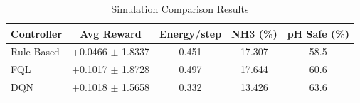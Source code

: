 \begin{table}[h]
\centering
\caption{Simulation Comparison Results}
\label{tab:sim}
\begin{tabular}{lcccc}
\hline
Controller & Avg Reward & Energy/step & NH3 (\%) & pH Safe (\%) \\
\hline
Rule-Based & +0.0466 $\pm$ 1.8337 & 0.451 & 17.307 & 58.5 \\
FQL & +0.1017 $\pm$ 1.8728 & 0.497 & 17.644 & 60.6 \\
DQN & +0.1018 $\pm$ 1.5658 & 0.332 & 13.426 & 63.6 \\
\hline
\end{tabular}
\end{table}
